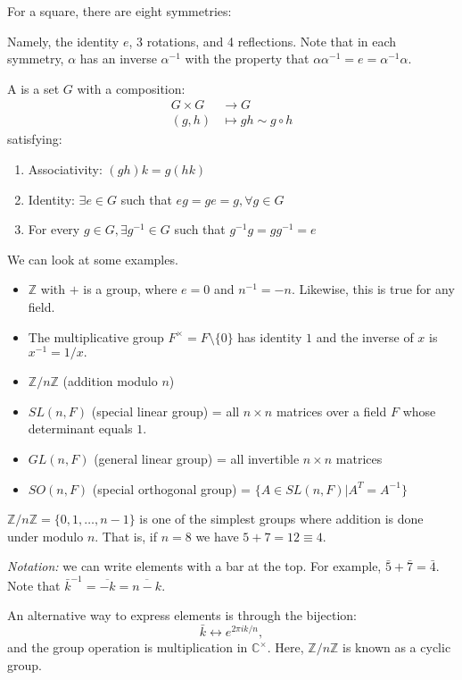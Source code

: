\documentclass{article}
\numberwithin{equation}{section}
\begin{document}
For a square, there are eight symmetries:
\begin{center}
\end{center}
Namely, the identity $e$, 3 rotations, and 4 reflections. Note that in each symmetry, $\alpha$ has an inverse $\alpha^{-1}$ with the property that $\alpha\alpha^{-1}=e=\alpha^{-1}\alpha.$
\begin{definition}
    A  is a set $G$ with a composition:
    \begin{align*}
        G\times G & \to G                     \\
        (g,h)     & \mapsto gh \sim g \circ h
    \end{align*}
    satisfying:
    \begin{enumerate}
        \item Associativity: $(gh)k = g(hk)$
        \item Identity: $\exists e \in G$ such that $eg=ge=g, \forall g \in G$
        \item For every $g\in G, \exists g^{-1}\in G$ such that $g^{-1}g=gg^{-1}=e$
    \end{enumerate}
\end{definition}
We can look at some examples.
\begin{itemize}
    \item $\mathbb{Z}$ with $+$ is a group, where $e=0$ and $n^{-1}=-n.$ Likewise, this is true for any field.
    \item The multiplicative group $F^\times= F\setminus \{0\}$ has identity $1$ and the inverse of $x$ is $x^{-1}=1/x.$
    \item $\mathbb{Z}/n\mathbb{Z}$ (addition modulo $n$)
    \item $SL(n,F)$ (special linear group) = all $n\times n$ matrices over a field $F$ whose determinant equals $1.$
    \item $GL(n,F)$ (general linear group) = all invertible $n\times n$ matrices
    \item $SO(n,F)$ (special orthogonal group) = $\{A\in SL(n,F) | A^T = A^{-1}\}$
\end{itemize}
\begin{example}
    $\mathbb{Z}/n\mathbb{Z} = \{0,1,\dots,n-1\}$ is one of the simplest groups where addition is done under modulo $n$. That is, if $n=8$ we have $5+7=12 \equiv 4.$

    \textit{Notation:} we can write elements with a bar at the top. For example, $\bar{5}+\bar{7} = \bar{4}.$ Note that $\bar{k}^{-1} = \overline{-k} = \overline{n-k}.$
    \vspace{2mm}

    An alternative way to express elements is through the bijection:
    \begin{equation*}
        \bar{k} \leftrightarrow e^{2\pi i k/n},
    \end{equation*}
    and the group operation is multiplication in $\mathbb{C}^\times.$ Here, $\mathbb{Z}/n\mathbb{Z}$ is known as a cyclic group.
\end{example}
\end{document}
